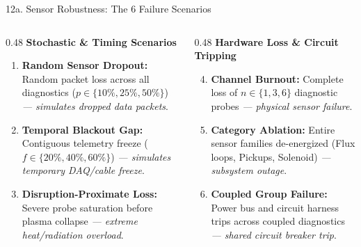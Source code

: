 \documentclass[aspectratio=169, 10pt]{beamer}
\begin{document}
\begin{frame}{12a. Sensor Robustness: The 6 Failure Scenarios}
  \begin{columns}[T]
    \begin{column}{0.48\textwidth}
      \textbf{\color{NavyBlue} Stochastic \& Timing Scenarios}
      \begin{enumerate}
        \item \textbf{Random Sensor Dropout:} Random packet loss across all diagnostics ($p \in \{10\%, 25\%, 50\%\}$) \textit{--- simulates dropped data packets}.
        \item \textbf{Temporal Blackout Gap:} Contiguous telemetry freeze ($f \in \{20\%, 40\%, 60\%\}$) \textit{--- simulates temporary DAQ/cable freeze}.
        \item \textbf{Disruption-Proximate Loss:} Severe probe saturation before plasma collapse \textit{--- extreme heat/radiation overload}.
      \end{enumerate}
    \end{column}

    \begin{column}{0.48\textwidth}
      \textbf{\color{NavyBlue} Hardware Loss \& Circuit Tripping}
      \begin{enumerate}
        \setcounter{enumi}{3}
        \item \textbf{Channel Burnout:} Complete loss of $n \in \{1, 3, 6\}$ diagnostic probes \textit{--- physical sensor failure}.
        \item \textbf{Category Ablation:} Entire sensor families de-energized (Flux loops, Pickups, Solenoid) \textit{--- subsystem outage}.
        \item \textbf{Coupled Group Failure:} Power bus and circuit harness trips across coupled diagnostics \textit{--- shared circuit breaker trip}.
      \end{enumerate}
    \end{column}
  \end{columns}
\end{frame}
\end{document}
